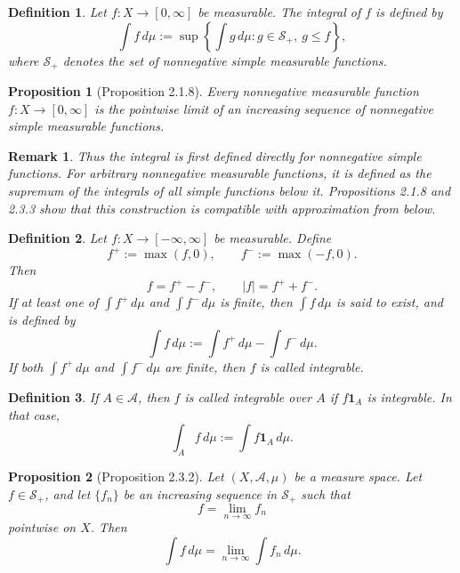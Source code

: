 \documentclass[12pt]{article}
\newtheorem{definition}{Definition}
\newtheorem{proposition}{Proposition}
\newtheorem{remark}{Remark}
\begin{document}
\begin{definition}
Let $f : X \to [0,\infty]$ be measurable. The integral of $f$ is defined by
\[
\int f\,d\mu
:=
\sup\left\{
\int g\,d\mu : g \in \mathcal{S}_+,\ g \le f
\right\},
\]
where $\mathcal{S}_+$ denotes the set of nonnegative simple measurable functions.
\end{definition}

\begin{proposition}[Proposition 2.1.8]
Every nonnegative measurable function $f : X \to [0,\infty]$ is the pointwise
limit of an increasing sequence of nonnegative simple measurable functions.
\end{proposition}

\begin{remark}
Thus the integral is first defined directly for nonnegative simple functions.
For arbitrary nonnegative measurable functions, it is defined as the supremum of
the integrals of all simple functions below it. Propositions 2.1.8 and 2.3.3
show that this construction is compatible with approximation from below.
\end{remark}

\begin{definition}
Let $f : X \to [-\infty,\infty]$ be measurable. Define
\[
f^+ := \max(f,0), \qquad f^- := \max(-f,0).
\]
Then
\[
f = f^+ - f^-,
\qquad
|f| = f^+ + f^-.
\]
If at least one of $\int f^+\,d\mu$ and $\int f^-\,d\mu$ is finite, then
$\int f\,d\mu$ is said to \emph{exist}, and is defined by
\[
\int f\,d\mu
:=
\int f^+\,d\mu - \int f^-\,d\mu.
\]
If both $\int f^+\,d\mu$ and $\int f^-\,d\mu$ are finite, then $f$ is called
\emph{integrable}.
\end{definition}

\begin{definition}
If $A \in \mathcal{A}$, then $f$ is called \emph{integrable over $A$} if
$f\mathbf{1}_A$ is integrable. In that case,
\[
\int_A f\,d\mu := \int f\mathbf{1}_A\,d\mu.
\]
\end{definition}

\begin{proposition}[Proposition 2.3.2]
Let $(X,\mathcal{A},\mu)$ be a measure space. Let $f\in\mathcal{S}_+$, and let
$\{f_n\}$ be an increasing sequence in $\mathcal{S}_+$ such that
\[
f = \lim_{n\to\infty} f_n
\]
pointwise on $X$. Then
\[
\int f\,d\mu = \lim_{n\to\infty} \int f_n\,d\mu.
\]
\end{proposition}
\end{document}

